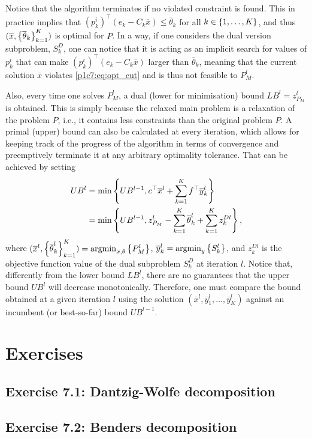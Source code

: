 Notice that the algorithm terminates if no violated constraint is found. This in practice implies that $(p^i_k)^\top(e_k - C_k \overline{x}) \leq \overline{\theta}_k$ for all $k \in \left\{ 1,\dots,K \right \}$, and thus $(\overline{x}, \left\{ \overline{\theta}_k \right \}_{k=1}^K)$ is optimal for $P$. In a way, if one considers the dual version subproblem, $S_k^D$, one can notice that it is acting as an implicit search for values of $p^i_k$ that can make $(p^i_k)^\top(e_k - C_k \overline{x})$ larger than $\overline{\theta}_k$, meaning that the current solution $\overline{x}$ violates \eqref{p1c7:eq:opt_cut} and is thus not feasible to $P_M^l$. 

Also, every time one solves $P_M^l$, a dual (lower for minimisation) bound $LB^l = z_{P_M}^l$ is obtained. This is simply because the relaxed main problem is a relaxation of the problem $P$, i.e., it contains less constraints than the original problem $P$. A primal (upper) bound can also be calculated at every iteration, which allows for keeping track of the progress of the algorithm in terms of convergence and preemptively terminate it at any arbitrary optimality tolerance. That can be achieved by setting
%
\begin{align*}
	UB^l &= \min\left\{ UB^{l-1}, c^\top \overline{x}^l + \sum_{k=1}^K f^\top \overline{y}_k^l \right \} \\	
	&= \min\left\{ UB^{l-1}, z_{P_M}^l - \sum_{k=1}^K \overline{\theta}_k^l + \sum_{k=1}^K z^{Dl}_{k} \right \},
\end{align*}
%
where $(\overline{x}^l, \left\{ \overline{\theta}^{l}_k \right \}_{k=1}^K) = \mathop{\rm argmin}_{x, \theta} \left\{ P_M^l \right \}$, $\overline{y}_k^l = \mathop{\rm argmin}_y \left\{ S_k^l \right \}$, and $z^{Dl}_{k}$ is the objective function value of the dual subproblem $S_k^D$ at iteration $l$. Notice that, differently from the lower bound $LB^l$, there are no guarantees that the upper bound $UB^l$ will decrease monotonically. Therefore, one must compare the bound obtained at a given iteration $l$ using the solution $(\overline{x}^l, \overline{y}_1^l,\dots, \overline{y}^l_K)$ against an incumbent (or best-so-far) bound $UB^{l-1}$.

\vfill 

\pagebreak	

\section{Exercises}

\subsection*{Exercise 7.1: Dantzig-Wolfe decomposition}


%

\subsection*{Exercise 7.2: Benders decomposition}


